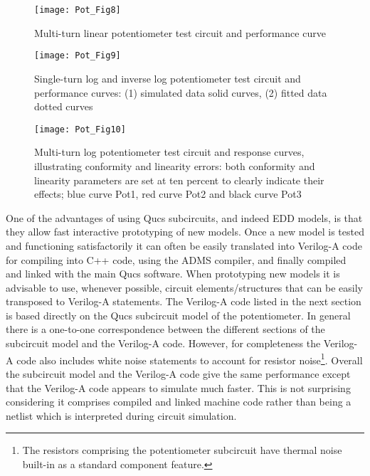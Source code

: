 \begin{figure} [here] 
  \centering
  \texttt{[image: Pot\_Fig8]}
  \caption{Multi-turn linear potentiometer test circuit and performance curve}
  \label{fig:Pot8}
\end{figure} 


\begin{figure} [here]  
  \centering
  \texttt{[image: Pot\_Fig9]}
  \caption{Single-turn log and inverse log potentiometer test circuit and performance curves: (1) simulated data  solid curves, (2) fitted data dotted curves}
  \label{fig:Pot9}
\end{figure} 


\begin{figure} [here] 
  \centering
  \texttt{[image: Pot\_Fig10]}
  \caption{Multi-turn log potentiometer test circuit and response curves, illustrating conformity and linearity errors: both conformity and linearity parameters are set at ten percent to clearly indicate their effects; blue curve Pot1, red curve Pot2 and black curve Pot3}
  \label{fig:Pot10}
\end{figure} 



One of the advantages of using Qucs subcircuits, and indeed EDD
models, is that they allow fast interactive prototyping of new models.
Once a new model is tested and functioning satisfactorily it can often
be easily translated into Verilog-A code for compiling into C++ code,
using the ADMS compiler, and finally compiled and linked with the main
Qucs software. When prototyping new models it is advisable to use,
whenever possible, circuit elements/structures that can be easily
transposed to Verilog-A statements.  The Verilog-A code listed in the
next section is based directly on the Qucs subcircuit model of the
potentiometer. In general there is a one-to-one correspondence between
the different sections of the subcircuit model and the Verilog-A code.
However, for completeness the Verilog-A code also includes white noise
statements to account for resistor noise\footnote{The resistors
comprising the potentiometer subcircuit have thermal noise built-in as
a standard component feature.}.  Overall the subcircuit model and the
Verilog-A code give the same performance except that the Verilog-A
code appears to simulate much faster. This is not surprising
considering it comprises compiled and linked machine code rather than
being a netlist which is interpreted during circuit simulation.

